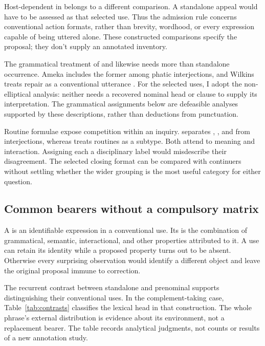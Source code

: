 Host-dependent  in  belongs to
a different comparison. A standalone appeal  would have
to be assessed as that selected use. Thus the admission rule concerns
conventional action formats, rather than brevity, wordhood, or every
expression capable of being uttered alone. These constructed comparisons
specify the proposal; they don't supply an annotated inventory.

The grammatical treatment of  and  likewise
needs more than standalone occurrence. Ameka includes the former among
phatic interjections, and Wilkins treats repair  as a
conventional utterance \citep[114]{ameka1992}\citep[152]{wilkins1992}.
For the selected uses, I adopt the non-elliptical analysis: neither needs
a recovered nominal head or clause to supply its interpretation.
The grammatical assignments below are defeasible analyses supported by
these descriptions, rather than deductions from punctuation.

Routine formulae expose competition within an inquiry.
\textcite[108--110]{ameka1992} separates , ,
and  from interjections, whereas
\textcite[142]{wilkins1992} treats routines as a subtype. Both attend
to meaning and interaction. Assigning each a disciplinary label would
misdescribe their disagreement. The selected closing format can be
compared with continuers without settling whether the wider grouping
is the most useful category for either question.

\subsection{Common bearers without a compulsory matrix}

A  is an identifiable expression in a conventional use.
Its  is the combination of grammatical, semantic, interactional,
and other properties attributed to it. A use can retain its identity
while a proposed property turns out to be absent. Otherwise every
surprising observation would identify a different object and leave the
original proposal immune to correction.

The recurrent contrast between standalone and prenominal 
supports distinguishing their conventional uses. In the complement-taking
case, Table~\ref{tab:contrasts} classifies the lexical head 
in that construction. The whole phrase's external distribution is evidence
about its environment, not a replacement bearer. The table records
analytical judgments, not counts or results of a new annotation study.

